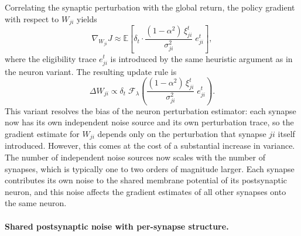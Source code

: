     Correlating the synaptic perturbation with the global return, the policy gradient with
    respect to $W_{ji}$ yields
    \[
        \nabla_{W_{ji}} J
        \approx
        \mathbb{E}\!\left[
            \delta_t \cdot
            \frac{(1 - \alpha^2)\, \xi_{ji}^t}{\sigma_{ji}^2}
            \; e_{ji}^t
        \right],
    \]
    where the eligibility trace $e_{ji}^t$ is introduced by the same heuristic argument as
    in the neuron variant. The resulting update rule is
    \[
        \Delta W_{ji}
        \propto
        \delta_t\;
        \mathcal{F}_{\lambda}
        \!\left(
            \frac{(1 - \alpha^2)\, \xi_{ji}^t}{\sigma_{ji}^2}\;
            e_{ji}^t
        \right).
    \]
    This variant resolves the bias of the neuron perturbation estimator: each synapse now
    has its own independent noise source and its own perturbation trace, so the gradient
    estimate for $W_{ji}$ depends only on the perturbation that synapse $ji$ itself
    introduced. However, this comes at the cost of a substantial increase in variance.
    The number of independent noise sources now scales with the number of synapses, which is typically one to two orders of magnitude larger.
    Each synapse contributes its own noise to the shared membrane potential of its
    postsynaptic neuron, and this noise affects the gradient estimates of all other synapses
    onto the same neuron.
    
    \paragraph{Shared postsynaptic noise with per-synapse structure.}
    
